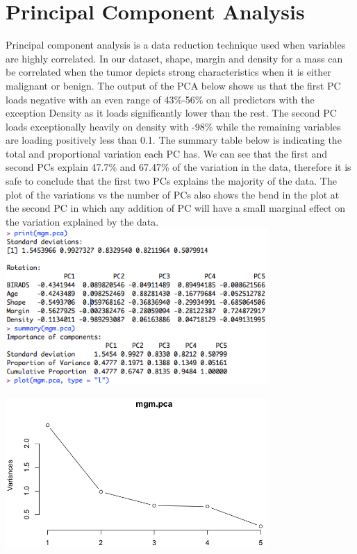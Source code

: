 \documentclass[a4paper, 12pt, one column, aas_macros]{article}
\begin{document}
\section{Principal Component Analysis}
Principal component analysis is a data reduction technique used when variables are highly correlated. In our dataset, shape, margin and density for a mass can be correlated when the tumor depicts strong characteristics when it is either malignant or benign. The output of the PCA below shows us that the first PC loads negative with an even range of 43\%-56\% on all predictors with the exception Density as it loads significantly lower than the rest.  The second PC loads exceptionally heavily on density with -98\% while the remaining variables are loading positively less than 0.1. The summary table below is indicating the total and proportional variation each PC has. We can see that the first and second PCs explain 47.7\% and 67.47\% of the variation in the data, therefore it is safe to conclude that the first two PCs explains the majority of the data. The plot of the variations vs the number of PCs also shows the bend in the plot at the second PC in which any addition of PC will have a small marginal effect on the variation explained by the data. 
\\
\includegraphics[width=10cm]{PCA.png}

\includegraphics[width=10cm]{PCAplot.png}
\end{document}
